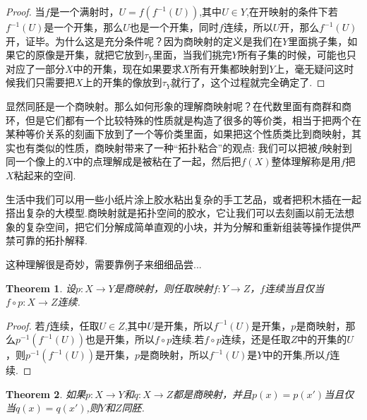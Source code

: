 \documentclass{article}
\newtheorem{theorem}{Theorem}[section]
\newcommand*{\xfunc}[4]{{#2}\colon{#3}{#1}{#4}}
\newcommand*{\func}[3]{\xfunc{\to}{#1}{#2}{#3}}
\begin{document}
\begin{proof}
当$f$是一个满射时，$U=f(f^{-1}(U))$,其中$U \in Y$,在开映射的条件下若$f^{-1}(U)$是一个开集，那么$U$也是一个开集，同时$f$连续，所以$U$开，那么$f^{-1}(U)$开，证毕。为什么这是充分条件呢？因为商映射的定义是我们在$Y$里面挑子集，如果它的原像是开集，就把它放到$\tau_Y$里面，当我们挑完$Y$所有子集的时候，可能也只对应了一部分$X$中的开集，现在如果要求$X$所有开集都映射到$Y$上，毫无疑问这时候我们只需要把$X$上的开集的像放到$\tau_Y$就行了，这个过程就完全确定了.
\end{proof}

显然同胚是一个商映射。那么如何形象的理解商映射呢？在代数里面有商群和商环，但是它们都有一个比较特殊的性质就是构造了很多的等价类，相当于把两个在某种等价关系的刻画下放到了一个等价类里面，如果把这个性质类比到商映射，其实也有类似的性质，商映射带来了一种“拓扑粘合”的观点: 我们可以把被$f$映射到同一个像上的$X$中的点理解成是被粘在了一起，然后把$f(X)$整体理解称是用$f$把$X$粘起来的空间.

生活中我们可以用一些小纸片涂上胶水粘出复杂的手工艺品，或者把积木插在一起搭出复杂的大模型.商映射就是拓扑空间的胶水，它让我们可以去刻画以前无法想象的复杂空间，把它们分解成简单直观的小块，并为分解和重新组装等操作提供严禁可靠的拓扑解释.

这种理解很是奇妙，需要靠例子来细细品尝...

\begin{theorem}
设$\func{p}{X}{Y}$是商映射，则任取映射$\func{f}{Y}{Z}$，$f$连续当且仅当$\func{f \circ p}{X}{Z}$连续.
\end{theorem}

\begin{proof}
若$f$连续，任取$U \in Z$,其中$U$是开集，所以$f^{-1}(U)$是开集，$p$是商映射，那么$p^{-1}(f^{-1}(U))$也是开集，所以$f \circ p$连续.若$f \circ p$连续，还是任取$Z$中的开集的$U$，则$p^{-1}(f^{-1}(U))$是开集，$p$是商映射，所以$f^{-1}(U)$是$Y$中的开集,所以$f$连续.
\end{proof}

\begin{theorem}
如果$\func{p}{X}{Y}$和$\func{q}{X}{Z}$都是商映射，并且$p(x)=p(x')$当且仅当$q(x)=q(x')$,则$Y$和$Z$同胚.
\begin{center}
\end{center}
\end{theorem}
\end{document}
